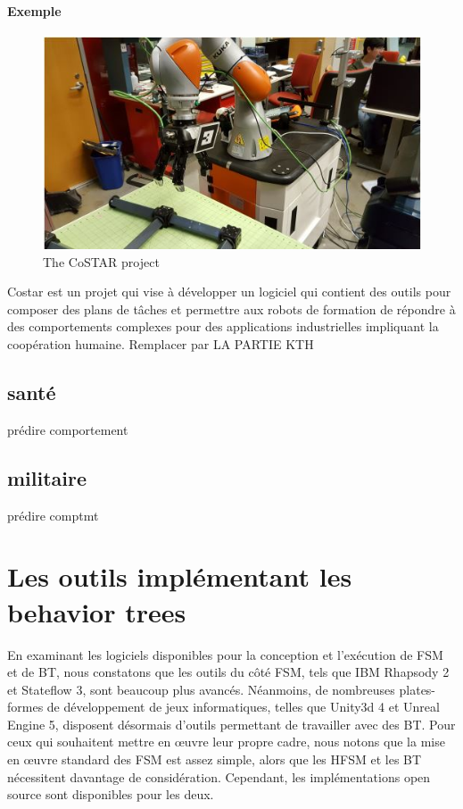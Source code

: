 \documentclass[titlepage]{article}
\begin{document}
		\paragraph{Exemple}
		\begin{figure}[h!]
			\includegraphics[width=\linewidth]{img/robotind.jpg}
			\caption{The CoSTAR project}
			\label{fig:civil}
		\end{figure}
		Costar est un projet qui vise à développer un logiciel qui contient des outils pour composer des plans de tâches et permettre aux robots de formation de répondre à des comportements complexes pour des applications industrielles impliquant la coopération humaine.
		Remplacer par LA PARTIE KTH
		
		\subsection{santé}
	prédire comportement
	
		\subsection{militaire}
	prédire comptmt
	
	\clearpage
	\section{Les outils implémentant les behavior trees}
		En examinant les logiciels disponibles pour la conception et l'exécution de FSM et de BT, nous constatons que les outils du côté FSM, tels que IBM Rhapsody 2 et Stateflow 3, sont beaucoup plus avancés. Néanmoins, de nombreuses plates-formes de développement de jeux informatiques, telles que Unity3d 4 et Unreal Engine 5, disposent désormais d'outils permettant de travailler avec des BT. Pour ceux qui souhaitent mettre en œuvre leur propre cadre, nous notons que la mise en œuvre standard des FSM est assez simple, alors que les HFSM et les BT nécessitent davantage de considération. Cependant, les implémentations open source sont disponibles pour les deux.
\end{document}
